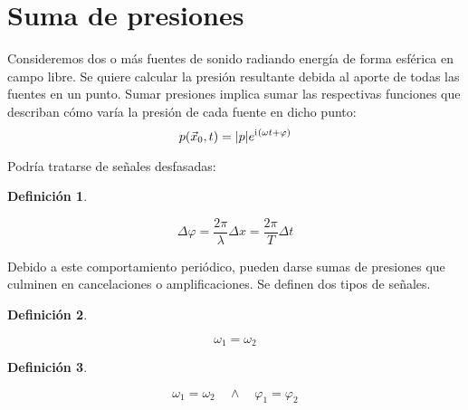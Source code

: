 \documentclass[a5paper,12pt,twoside]{book}
\newtheorem{defn}{{Definición}}[chapter]
\begin{document}
\section{Suma de presiones}

Consideremos dos o más fuentes de sonido radiando energía de forma esférica en campo libre. Se quiere calcular la presión resultante debida al aporte de todas las fuentes en un punto. Sumar presiones implica sumar las respectivas funciones que describan cómo varía la presión de cada fuente en dicho punto:
\begin{equation*}
    p(\Vec{x}_0,t) = {\left| {p} \right|} e^{\mathrm{i}\mkern1mu(\omega t + \varphi)}
\end{equation*}

Podría tratarse de señales desfasadas:

\begin{mdframed}[style=MyFrame1]
    \begin{defn}
    \end{defn}
    \begin{equation*}
        \Delta \varphi = \frac{2\pi}{\lambda} \Delta x = \frac{2\pi}{T} \Delta t
    \end{equation*}
\end{mdframed}

Debido a este comportamiento periódico, pueden darse sumas de presiones que culminen en cancelaciones o amplificaciones. Se definen dos tipos de señales.

\begin{mdframed}[style=MyFrame1]
    \begin{defn}
    \end{defn}
    \begin{equation*}
        \omega_1=\omega_2
    \end{equation*}
\end{mdframed}

\begin{mdframed}[style=MyFrame1]
    \begin{defn}
    \end{defn}
    \begin{equation*}
        \omega_1=\omega_2 \quad \land \quad \varphi_1=\varphi_2
    \end{equation*}
\end{mdframed}
\end{document}
